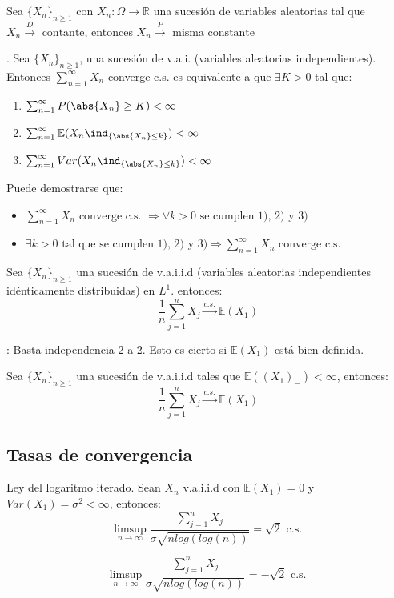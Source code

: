 \documentclass{apuntes}
\begin{document}
\begin{theorem}
Sea $\{X_n\}_{n \geq 1}$ con $X_n: \Omega \rightarrow \mathbb{R}$ una sucesión de variables aleatorias tal que $X_n \stackrel{D}{\rightarrow} \text{ contante}$, entonces $X_n \stackrel{P}{\rightarrow} \text{ misma constante }$
\end{theorem}

\begin{theorem}.
Sea $\{X_n\}_{n\geq 1}$, una sucesión de v.a.i. (variables aleatorias independientes). Entonces $\sum_{n=1}^{\infty} X_n$ converge c.s. es equivalente a que $\exists K >0$ tal que:
\begin{enumerate}
\item $\sum_{n=1}^{\infty} P(\abs{X_n}\geq K)<\infty$
\item $\sum_{n=1}^{\infty} \mathbb{E}(X_n \ind_{\{\abs{X_n}\leq k\}}) <\infty$
\item $\sum_{n=1}^{\infty} Var(X_n \ind_{\{\abs{X_n}\leq k\}}) <\infty$
\end{enumerate}
Puede demostrarse que:
\begin{itemize}
\item $\sum_{n=1}^{\infty} X_n \text{ converge c.s. }  \Rightarrow \forall k>0 \text{ se cumplen 1), 2) y 3)}$
\item $\exists k>0 \text{ tal que se cumplen 1), 2) y 3)} \Rightarrow \sum_{n=1}^{\infty} X_n \text{ converge c.s. } $
\end{itemize}
\end{theorem}

\begin{theorem}
Sea $\{X_n\}_{n\geq 1}$ una sucesión de v.a.i.i.d (variables aleatorias independientes idénticamente distribuidas) en $L^1$. entonces:
\[
\frac{1}{n}\sum_{j=1}^{n}X_j \stackrel{c.s.}{\rightarrow} \mathbb{E}(X_1)
\]

\obs: Basta independencia 2 a 2. Esto es cierto si $\mathbb{E}(X_1)$ está bien definida.
\end{theorem}

\begin{theorem}
Sea $\{X_n\}_{n \geq 1}$ una sucesión de v.a.i.i.d tales que $\mathbb{E}((X_1)_-) < \infty$, entonces:
\[
\frac{1}{n}\sum_{j=1}^{n}X_j \stackrel{c.s.}{\rightarrow} \mathbb{E}(X_1)
\]
\end{theorem}

\subsection{Tasas de convergencia}
\begin{defn}
Ley del logaritmo iterado. Sean $X_n$ v.a.i.i.d con $\mathbb{E}(X_1)=0$ y $Var(X_1)=\sigma^2<\infty$, entonces:
\[
\limsup_{n \rightarrow \infty} \frac{\sum_{j=1}^{n} X_j}{\sigma \sqrt{nlog(log(n))}}=\sqrt{2} \text{ c.s. }
\]

\obs
\[
\limsup_{n \rightarrow \infty} \frac{\sum_{j=1}^{n} X_j}{\sigma \sqrt{nlog(log(n))}}=-\sqrt{2} \text{ c.s. }
\] 
\end{defn}
\end{document}
